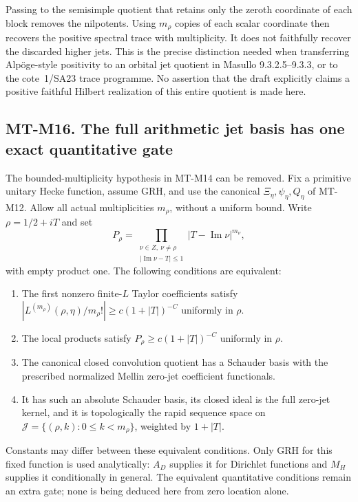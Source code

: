 Passing to the semisimple quotient that retains only the
zeroth coordinate of each block removes the nilpotents.
Using $m_\rho$ copies of each scalar coordinate then
recovers the positive spectral trace with multiplicity.
It does not faithfully recover the discarded higher
jets. This is the precise distinction needed when
transferring Alpöge-style positivity to an orbital
jet quotient in Masullo 9.3.2.5--9.3.3, or to the
cote~1/SA23 trace programme. No assertion that the
draft explicitly claims a positive faithful Hilbert
realization of this entire quotient is made here.

\subsection*{MT-M16. The full arithmetic jet basis has one exact quantitative gate}
The bounded-multiplicity hypothesis in MT-M14 can be removed.
Fix a primitive unitary Hecke function, assume GRH, and use
the canonical $\Xi_\eta,\psi_\eta,Q_\eta$ of MT-M12.
Allow all actual multiplicities $m_\rho$, without a uniform
bound. Write $\rho=1/2+iT$ and set
\[
 P_\rho=
  \prod_{\substack{\nu\in Z,\ \nu\ne\rho\\
              |\operatorname{Im}\nu-T|\le1}}
              |T-\operatorname{Im}\nu|^{m_\nu},
\]
with empty product one. The following conditions are equivalent:
\begin{enumerate}
\item The first nonzero finite-$L$ Taylor coefficients satisfy
$|L^{(m_\rho)}(\rho,\eta)/m_\rho!|
                       \ge c(1+|T|)^{-C}$ uniformly in $\rho$.
\item The local products satisfy
$P_\rho\ge c(1+|T|)^{-C}$ uniformly in $\rho$.
\item The canonical closed convolution quotient has a
Schauder basis with the prescribed normalized Mellin
zero-jet coefficient functionals.
\item It has such an absolute Schauder basis, its closed
ideal is the full zero-jet kernel, and it is topologically
the rapid sequence space on
$\mathcal J=\{(\rho,k):0\le k<m_\rho\}$, weighted by $1+|T|$.
\end{enumerate}
Constants may differ between these equivalent conditions.
Only GRH for this fixed function is used analytically:
$A_D$ supplies it for Dirichlet functions and $M_H$
supplies it conditionally in general. The equivalent
quantitative conditions remain an extra gate; none is
being deduced here from zero location alone.

